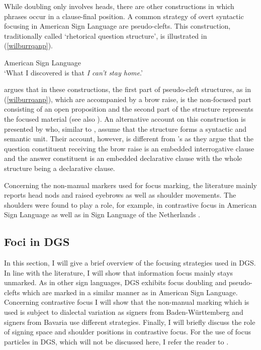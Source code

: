 While doubling only involves heads, there are other constructions in which phrases occur in a clause-final position. \label{pseudocleeeeefts}A common strategy of overt syntactic focusing in American Sign Language are pseudo-clefts. This construction, traditionally called `rhetorical question structure', is illustrated in (\ref{wilburrqanp}).

\begin{exe}
\ex American Sign Language \citep[92]{wilbur1997prosodic} \\  
\glt `What I discovered is that \textit{I can't stay home}.' \label{wilburrqanp}
\end{exe}

\noindent \citet{wilbur1997prosodic} argues that in these constructions, the first part of pseudo-cleft structures, as in (\ref{wilburrqanp}), which are accompanied by a brow raise, is the non-focused part consisting of an open proposition and the second part of the structure represents the focused material (see also \citealt{wilbur1994foregrounding, wilbur1996evidence}). An alternative account on this construction is presented by \citet{caponigro2011ask} who, similar to \citet{wilbur1996evidence}, assume that the structure forms a syntactic and semantic unit. Their account, however, is different from \citeauthor{wilbur1996evidence}'s as they argue that the question constituent receiving the brow raise is an embedded interrogative clause and the answer constituent is an embedded declarative clause with the whole structure being a declarative clause.

Concerning the non-manual markers used for focus marking, the literature mainly reports head nods and raised eyebrows  as well as shoulder movements. The shoulders were found to play a role, for example, in contrastive focus in American Sign Language \citep{wilbur1999syntactic} as well as in Sign Language of the Netherlands \citep{crasborn2013phonology}.

\subsection{Foci in DGS}
In this section, I will give a brief overview of the focusing strategies used in DGS. In line with the literature, I will show that information focus mainly stays unmarked. As in other sign languages, DGS exhibits focus doubling and pseudo-clefts which are marked in a similar manner as in American Sign Language. Concerning contrastive focus I will show that the non-manual marking which is used is subject to dialectal variation as signers from Baden-Württemberg and signers from Bavaria use different strategies. Finally, I will briefly discuss the role of signing space and shoulder positions in contrastive focus. For the use of focus particles in DGS, which will not be discussed here, I refer the reader to \citet{herrmann2013modal}.

